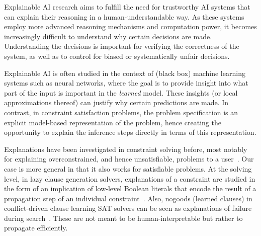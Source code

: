 


Explainable AI research aims to fulfill the need for trustworthy AI systems that can explain their reasoning in a human-understandable way. 
As these systems employ more advanced reasoning mechanisms and computation power, it becomes increasingly difficult to understand why certain decisions are made. 
Understanding the decisions is important for verifying the correctness of the system, as well as to control for biased or systematically unfair decisions.

Explainable AI is often studied in the context of (black box) machine learning systems such as neural networks, where the goal is to provide insight into what part of the input is important in the \textit{learned} model. These insights (or local approximations thereof) can justify why certain predictions are made. In contrast, in constraint satisfaction problems, the problem specification is an explicit model-based representation of the problem, hence creating the opportunity to explain the inference steps directly in terms of this representation.

Explanations have been investigated in constraint solving before, most notably for explaining overconstrained, and hence unsatisfiable, problems to a user~\cite{junker2001quickxplain}.
Our case is more general in that it also works for satisfiable problems.
At the solving level, in lazy clause generation solvers, explanations of a constraint are studied in the form of an implication of low-level Boolean literals that encode the result of a propagation step of an individual constraint~\cite{feydy2009lazy}. 
Also, nogoods (learned clauses) in conflict-driven clause learning SAT solvers can be seen as explanations of failure during search~\cite{marques2009conflict}. 
These are not meant to be human-interpretable but rather to propagate efficiently.


